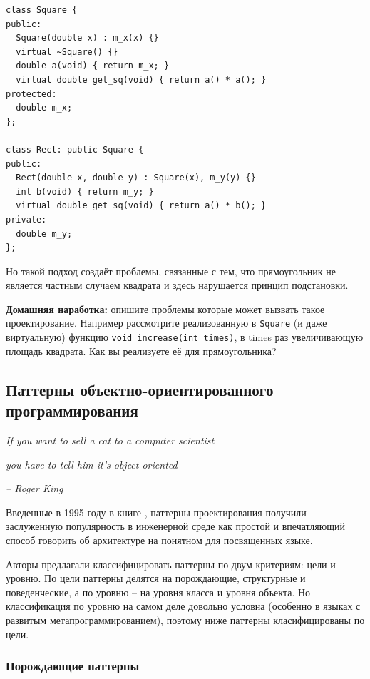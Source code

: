 \documentclass[a4paper,12pt,oneside]{article}
\begin{document}
\begin{lstlisting}
class Square {
public:
  Square(double x) : m_x(x) {}
  virtual ~Square() {}
  double a(void) { return m_x; }
  virtual double get_sq(void) { return a() * a(); }
protected:
  double m_x;
};

class Rect: public Square {
public:
  Rect(double x, double y) : Square(x), m_y(y) {}
  int b(void) { return m_y; }
  virtual double get_sq(void) { return a() * b(); }
private:
  double m_y;
};
\end{lstlisting}

Но такой подход создаёт проблемы, связанные с тем, что прямоугольник не является частным случаем квадрата и здесь нарушается принцип подстановки. 

\textbf{Домашняя наработка:} опишите проблемы которые может вызвать такое проектирование. Например рассмотрите реализованную в \lstinline!Square! (и даже виртуальную) функцию \lstinline!void increase(int times)!, в times раз увеличивающую площадь квадрата. Как вы реализуете её для прямоугольника?

\pagebreak
\subsection{Паттерны объектно-ориентированного программирования}\label{DesPatterns}

\hfill\textit{If you want to sell a cat to a computer scientist}

\hfill\textit{you have to tell him it's object-oriented}{\vspace{0.5em}}

\hfill\textit{-- Roger King}

Введенные в 1995 году в книге \cite{DPatterns}, паттерны проектирования получили заслуженную популярность в инженерной среде как простой и впечатляющий способ говорить об архитектуре на понятном для посвященных языке.

Авторы предлагали классифицировать паттерны по двум критериям: цели и уровню. По цели паттерны делятся на порождающие, структурные и поведенческие, а по уровню -- на уровня класса и уровня объекта. Но классификация по уровню на самом деле довольно условна (особенно в языках с развитым метапрограммированием), поэтому ниже паттерны класифицированы по цели.

\subsubsection{Порождающие паттерны}
\end{document}
